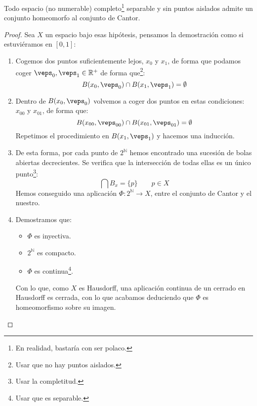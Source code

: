\begin{lema}[de Cantor]
    Todo espacio (no numerable) completo\footnote{En realidad, bastaría con ser polaco.} separable y sin puntos aislados admite un conjunto homeomorfo al conjunto de Cantor.
    \begin{proof}
        Sea $X$ un espacio bajo esas hipótesis, pensamos la demostración como si estuviéramos en $[0,1]$:
        \begin{enumerate}
            \item Cogemos dos puntos suficientemente lejos, $x_0$ y $x_1$, de forma que podamos coger $\veps_0,\veps_1\in \mathbb{R}^+$ de forma que\footnote{Usar que no hay puntos aislados.}:
                \begin{equation*}
                    B(x_0,\veps_0) \cap B(x_1,\veps_1) = \emptyset 
                \end{equation*}
            \item Dentro de $B(x_0,\veps_0)$ volvemos a coger dos puntos en estas condiciones: $x_{00}$ y $x_{01}$, de forma que:
                \begin{equation*}
                    B(x_{00}, \veps_{00}) \cap B(x_{01}, \veps_{01}) = \emptyset 
                \end{equation*}
                Repetimos el procedimiento en $B(x_1,\veps_1)$ y hacemos una inducción.
            \item De esta forma, por cada punto de $2^\mathbb{N}$ hemos encontrado una sucesión de bolas abiertas decrecientes. Se verifica que la intersección de todas ellas es un único punto\footnote{Usar la completitud.}:
                \begin{equation*}
                    \bigcap B_x = \{p\} \qquad p\in X
                \end{equation*}
                Hemos conseguido una aplicación $\Phi:2^\mathbb{N}\to X$, entre el conjunto de Cantor y el nuestro.
            \item Demostramos que:
                \begin{itemize}
                    \item $\Phi$ es inyectiva.
                    \item $2^{\mathbb{N}}$ es compacto.
                    \item $\Phi$ es continua\footnote{Usar que es separable.}.
                \end{itemize}
                Con lo que, como $X$ es Hausdorff, una aplicación continua de un cerrado en Hausdorff es cerrada, con lo que acabamos deduciendo que $\Phi$ es homeomorfismo sobre su imagen.
        \end{enumerate}
    \end{proof}
\end{lema}

